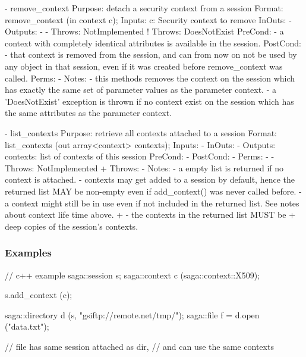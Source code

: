 \begin{myspec}
 
    - remove_context
      Purpose:  detach a security context from a session
      Format:   remove_context       (in context  c);
      Inputs:   c:                    Security context to remove
      InOuts:   -
      Outputs:  -
-     Throws:   NotImplemented
!     Throws:   DoesNotExist
      PreCond:  - a context with completely identical attributes
                  is available in the session.
      PostCond: - that context is removed from the session, and
                  can from now on not be used by any object in
                  that session, even if it was created before
                  remove_context was called.
      Perms:    -
      Notes:    - this methods removes the context on the
                  session which has exactly the same set of
                  parameter values as the parameter context.
                - a 'DoesNotExist' exception is thrown if no
                  context exist on the session which has the
                  same attributes as the parameter context.
 

    - list_contexts
      Purpose:  retrieve all contexts attached to a session
      Format:   list_contexts        (out array<context>
                                                  contexts);
      Inputs:   -
      InOuts:   -
      Outputs:  contexts:             list of contexts of this
                                      session
      PreCond:  -
      PostCond: -
      Perms:    -
-     Throws:   NotImplemented
+     Throws:   -
      Notes:    - a empty list is returned if no context is
                  attached.
                - contexts may get added to a session by 
                  default, hence the returned list MAY be 
                  non-empty even if add_context() was never 
                  called before.
                - a context might still be in use even if not
                  included in the returned list.  See notes
                  about context life time above.
+               - the contexts in the returned list MUST be
+                 deep copies of the session's contexts.
 \end{myspec}
 
 
 \subsubsection{Examples}
 
 \begin{mycode}
  // c++ example
  saga::session s;
  saga::context c (saga::context::X509);
 
  s.add_context   (c);
 
  saga::directory  d (s, "gsiftp://remote.net/tmp/");
  saga::file       f = d.open ("data.txt");
 
  // file has same session attached as dir,
  // and can use the same contexts
 \end{mycode}
 
